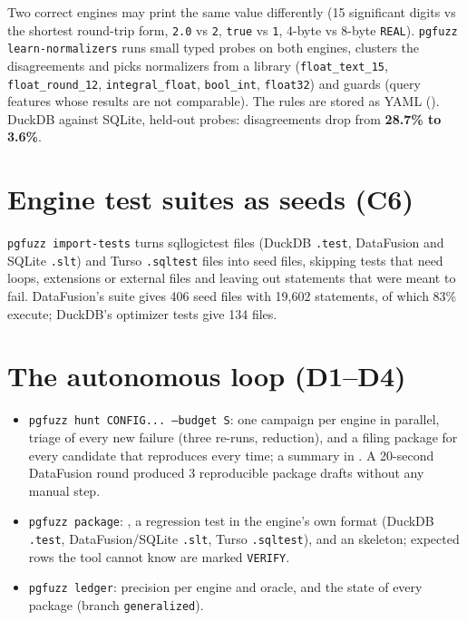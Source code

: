 Two correct engines may print the same value differently (15 significant digits
vs the shortest round-trip form, \texttt{2.0} vs \texttt{2}, \texttt{true} vs
\texttt{1}, 4-byte vs 8-byte \texttt{REAL}). \texttt{pgfuzz learn-normalizers}
runs small typed probes on both engines, clusters the disagreements and picks
normalizers from a library (\texttt{float\_text\_15}, \texttt{float\_round\_12},
\texttt{integral\_float}, \texttt{bool\_int}, \texttt{float32}) and guards (query
features whose results are not comparable). The rules are stored as YAML
(). DuckDB against SQLite, held-out
probes: disagreements drop from \textbf{28.7\% to 3.6\%}.

\section{Engine test suites as seeds (C6)}

\texttt{pgfuzz import-tests} turns sqllogictest files (DuckDB \texttt{.test},
DataFusion and SQLite \texttt{.slt}) and Turso \texttt{.sqltest} files into seed
files, skipping tests that need loops, extensions or external files and leaving
out statements that were meant to fail. DataFusion's suite gives 406 seed files
with 19{,}602 statements, of which 83\% execute; DuckDB's optimizer tests give
134 files.

\section{The autonomous loop (D1--D4)}

\begin{itemize}
  \item \texttt{pgfuzz hunt CONFIG... --budget S}: one campaign per engine in
    parallel, triage of every new failure (three re-runs, reduction), and a
    filing package for every candidate that reproduces every time; a summary in
    . A 20-second DataFusion round produced 3 reproducible
    package drafts without any manual step.
  \item \texttt{pgfuzz package}: , a regression test in the
    engine's own format (DuckDB \texttt{.test}, DataFusion/SQLite \texttt{.slt},
    Turso \texttt{.sqltest}),  and an  skeleton;
    expected rows the tool cannot know are marked \texttt{VERIFY}.
  \item \texttt{pgfuzz ledger}: precision per engine and oracle, and the state
    of every package (branch \texttt{generalized}).
\end{itemize}

